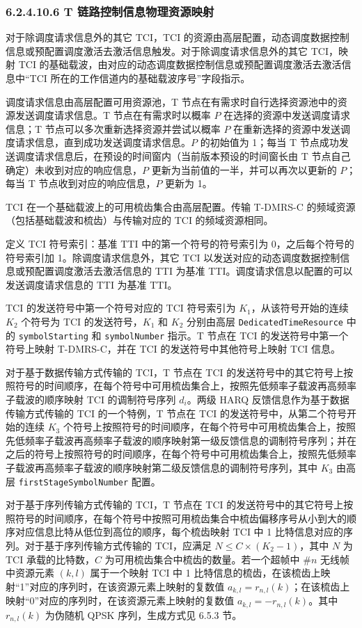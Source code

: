 \documentclass[11pt,a4paper]{ctexart}
\begin{document}
\subsubsection{6.2.4.10.6 T 链路控制信息物理资源映射}

对于除调度请求信息外的其它 TCI，TCI 的资源由高层配置，动态调度数据控制信息或预配置调度激活去激活信息触发。对于除调度请求信息外的其它 TCI，映射 TCI 的基础载波，由对应的动态调度数据控制信息或预配置调度激活去激活信息中``TCI 所在的工作信道内的基础载波序号''字段指示。

调度请求信息由高层配置可用资源池，T 节点在有需求时自行选择资源池中的资源发送调度请求信息。T 节点在有需求时以概率 $P$ 在选择的资源中发送调度请求信息；T 节点可以多次重新选择资源并尝试以概率 $P$ 在重新选择的资源中发送调度请求信息，直到成功发送调度请求信息。$P$ 的初始值为 1；每当 T 节点成功发送调度请求信息后，在预设的时间窗内（当前版本预设的时间窗长由 T 节点自己确定）未收到对应的响应信息，$P$ 更新为当前值的一半，并可以再次以更新的 $P$；每当 T 节点收到对应的响应信息，$P$ 更新为 1。

TCI 在一个基础载波上的可用梳齿集合由高层配置。传输 T-DMRS-C 的频域资源（包括基础载波和梳齿）与传输对应的 TCI 的频域资源相同。

定义 TCI 符号索引：基准 TTI 中的第一个符号的符号索引为 0，之后每个符号的符号索引加 1。除调度请求信息外，其它 TCI 以发送对应的动态调度数据控制信息或预配置调度激活去激活信息的 TTI 为基准 TTI。调度请求信息以配置的可以发送调度请求信息的 TTI 为基准 TTI。

TCI 的发送符号中第一个符号对应的 TCI 符号索引为 $K_1$，从该符号开始的连续 $K_2$ 个符号为 TCI 的发送符号，$K_1$ 和 $K_2$ 分别由高层 \texttt{DedicatedTimeResource} 中的 \texttt{symbolStarting} 和 \texttt{symbolNumber} 指示。T 节点在 TCI 的发送符号中第一个符号上映射 T-DMRS-C，并在 TCI 的发送符号中其他符号上映射 TCI 信息。

对于基于数据传输方式传输的 TCI，T 节点在 TCI 的发送符号中的其它符号上按照符号的时间顺序，在每个符号中可用梳齿集合上，按照先低频率子载波再高频率子载波的顺序映射 TCI 的调制符号序列 $d_i$。两级 HARQ 反馈信息作为基于数据传输方式传输的 TCI 的一个特例，T 节点在 TCI 的发送符号中，从第二个符号开始的连续 $K_3$ 个符号上按照符号的时间顺序，在每个符号中可用梳齿集合上，按照先低频率子载波再高频率子载波的顺序映射第一级反馈信息的调制符号序列；并在之后的符号上按照符号的时间顺序，在每个符号中可用梳齿集合上，按照先低频率子载波再高频率子载波的顺序映射第二级反馈信息的调制符号序列，其中 $K_3$ 由高层 \texttt{firstStageSymbolNumber} 配置。

对于基于序列传输方式传输的 TCI，T 节点在 TCI 的发送符号中的其它符号上按照符号的时间顺序，在每个符号中按照可用梳齿集合中梳齿偏移序号从小到大的顺序对应信息比特从低位到高位的顺序，每个梳齿映射 TCI 中 1 比特信息对应的序列。对于基于序列传输方式传输的 TCI，应满足 $N \leq C \times (K_2 - 1)$，其中 $N$ 为 TCI 承载的比特数，$C$ 为可用梳齿集合中梳齿的数量。若一个超帧中 \#$n$ 无线帧中资源元素 $(k, l)$ 属于一个映射 TCI 中 1 比特信息的梳齿，在该梳齿上映射``1''对应的序列时，在该资源元素上映射的复数值 $a_{k,l} = r_{n,l}(k)$；在该梳齿上映射``0''对应的序列时，在该资源元素上映射的复数值 $a_{k,l} = -r_{n,l}(k)$。其中 $r_{n,l}(k)$ 为伪随机 QPSK 序列，生成方式见 6.5.3 节。
\end{document}
